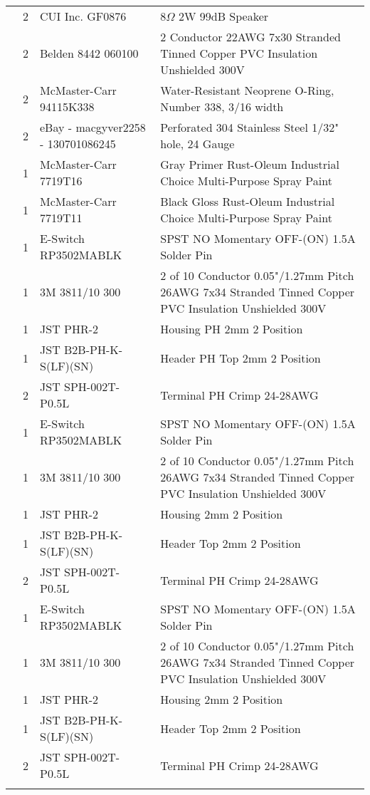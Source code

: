 \begin{longtabu}{X[3,c,m] X[1,c,m] X[3,c,m] X[5,l,m]}
   & 2 & CUI Inc. GF0876 & 8$\Omega$ 2W 99dB Speaker \\
  & 2 & Belden 8442 060100 & 2 Conductor 22AWG 7x30 Stranded Tinned Copper PVC Insulation Unshielded 300V \\
  & 2 & McMaster-Carr 94115K338 & Water-Resistant Neoprene O-Ring, Number 338, 3/16 width \\
  & 2 & eBay - macgyver2258 - 130701086245 & Perforated 304 Stainless Steel 1/32" hole, 24 Gauge \\
  & 1 & McMaster-Carr 7719T16 & Gray Primer Rust-Oleum Industrial Choice Multi-Purpose Spray Paint \\
  & 1 & McMaster-Carr 7719T11 & Black Gloss Rust-Oleum Industrial Choice Multi-Purpose Spray Paint \\ \mrule

   & 1 & E-Switch RP3502MABLK & SPST NO Momentary OFF-(ON) 1.5A Solder Pin \\
  & 1 & 3M 3811/10 300 & 2 of 10 Conductor 0.05"/1.27mm Pitch 26AWG 7x34 Stranded Tinned Copper PVC Insulation Unshielded 300V \\
  & 1 & JST PHR-2 & Housing PH 2mm 2 Position \\
  & 1 & JST B2B-PH-K-S(LF)(SN) & Header PH Top 2mm 2 Position \\
  & 2 & JST SPH-002T-P0.5L & Terminal PH Crimp 24-28AWG \\ \mrule

   & 1 & E-Switch RP3502MABLK & SPST NO Momentary OFF-(ON) 1.5A Solder Pin \\
  & 1 & 3M 3811/10 300 & 2 of 10 Conductor 0.05"/1.27mm Pitch 26AWG 7x34 Stranded Tinned Copper PVC Insulation Unshielded 300V \\
  & 1 & JST PHR-2 & Housing 2mm 2 Position \\
  & 1 & JST B2B-PH-K-S(LF)(SN) & Header Top 2mm 2 Position \\
  & 2 & JST SPH-002T-P0.5L & Terminal PH Crimp 24-28AWG \\ \mrule

   & 1 & E-Switch RP3502MABLK & SPST NO Momentary OFF-(ON) 1.5A Solder Pin \\
  & 1 & 3M 3811/10 300 & 2 of 10 Conductor 0.05"/1.27mm Pitch 26AWG 7x34 Stranded Tinned Copper PVC Insulation Unshielded 300V \\
  & 1 & JST PHR-2 & Housing 2mm 2 Position \\
  & 1 & JST B2B-PH-K-S(LF)(SN) & Header Top 2mm 2 Position \\
  & 2 & JST SPH-002T-P0.5L & Terminal PH Crimp 24-28AWG \\ \mrule


\end{longtabu}
